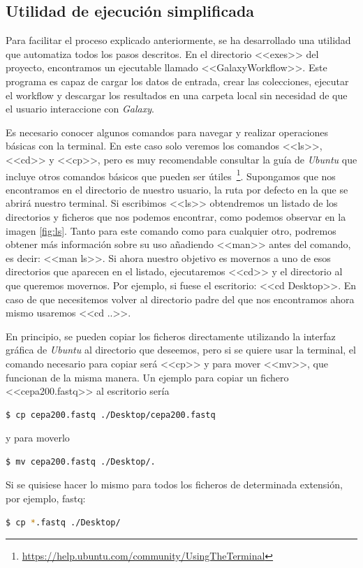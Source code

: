 \subsection{Utilidad de ejecución simplificada}
\label{EjecucionSimplificada}
Para facilitar el proceso explicado anteriormente, se ha desarrollado una utilidad que automatiza todos los pasos descritos. En el directorio <<exes>> del proyecto, encontramos un ejecutable llamado <<GalaxyWorkflow>>. Este programa es capaz de cargar los datos de entrada, crear las colecciones, ejecutar el workflow y descargar los resultados en una carpeta local sin necesidad de que el usuario interaccione con \textit{Galaxy}. 

Es necesario conocer algunos comandos para navegar y realizar operaciones básicas con la terminal. En este caso solo veremos los comandos <<ls>>, <<cd>> y <<cp>>, pero es muy recomendable consultar la guía de \textit{Ubuntu} que incluye otros comandos básicos que pueden ser útiles~\footnote{\url{https://help.ubuntu.com/community/UsingTheTerminal}}. Supongamos que nos encontramos en el directorio de nuestro usuario, la ruta por defecto en la que se abrirá nuestro terminal. Si escribimos <<ls>> obtendremos un listado de los directorios y ficheros que nos podemos encontrar, como podemos observar en la imagen \ref{fig:ls}. Tanto para este comando como para cualquier otro, podremos obtener más información sobre su uso añadiendo <<man>> antes del comando, es decir: <<man ls>>. Si ahora nuestro objetivo es movernos a uno de esos directorios que aparecen en el listado, ejecutaremos <<cd>> y el directorio al que queremos movernos. Por ejemplo, si fuese el escritorio: <<cd Desktop>>. En caso de que necesitemos volver al directorio padre del que nos encontramos ahora mismo usaremos <<cd ..>>.

En principio, se pueden copiar los ficheros directamente utilizando la interfaz gráfica de \textit{Ubuntu} al directorio que deseemos, pero si se quiere usar la terminal, el comando necesario para copiar será <<cp>> y para mover <<mv>>, que funcionan de la misma manera. Un ejemplo para copiar un fichero <<cepa200.fastq>> al escritorio sería
\begin{lstlisting}[language=bash]
    $ cp cepa200.fastq ./Desktop/cepa200.fastq
\end{lstlisting}
y para moverlo 
\begin{lstlisting}[language=bash]
    $ mv cepa200.fastq ./Desktop/.
\end{lstlisting}
Si se quisiese hacer lo mismo para todos los ficheros de determinada extensión, por ejemplo, fastq: 
\begin{lstlisting}[language=bash]
    $ cp *.fastq ./Desktop/
\end{lstlisting}

